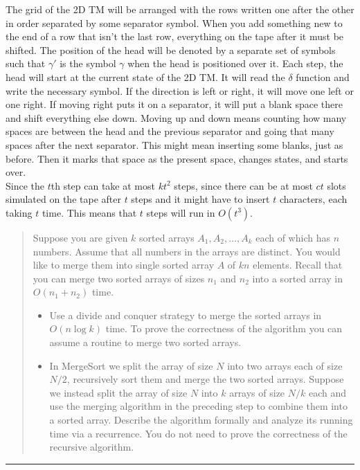 \documentclass[11pt]{article}
\begin{document}
\begin{solution}
    The grid of the 2D TM will be arranged with the rows written one after the other in order separated by some separator symbol. When you add something new to the end of a row that isn't the last row, everything on the tape after it must be shifted. The position of the head will be denoted by a separate set of symbols such that $\gamma'$ is the symbol $\gamma$ when the head is positioned over it. Each step, the head will start at the current state of the 2D TM. It will read the $\delta$ function and write the necessary symbol. If the direction is left or right, it will move one left or one right. If moving right puts it on a separator, it will put a blank space there and shift everything else down. Moving up and down means counting how many spaces are between the head and the previous separator and going that many spaces after the next separator. This might mean inserting some blanks, just as before. Then it marks that space as the present space, changes states, and starts over. \\

    Since the $t$th step can take at most $kt^2$ steps, since there can be at most $ct$ slots simulated on the tape after $t$ steps and it might have to insert $t$ characters, each taking $t$ time. This means that $t$ steps will run in $O(t^3)$.
\end{solution}


\begin{quote}
    Suppose you are given $k$ sorted arrays $A_1,A_2,\ldots,A_k$
  each of which has $n$ numbers. Assume that all numbers in the arrays
  are distinct. You would like to merge them into single sorted array
  $A$ of $kn$ elements. Recall that you can merge two sorted arrays of
  sizes $n_1$ and $n_2$ into a sorted array in $O(n_1+n_2)$ time.
  \begin{itemize}
  \item Use a divide and conquer strategy to merge the sorted arrays
    in $O(n \log k)$ time. To prove the correctness of the algorithm
    you can assume a routine to merge two sorted arrays.
  \item In MergeSort we split the array of size $N$ into two arrays
    each of size $N/2$, recursively sort them and merge the two sorted
    arrays. Suppose we instead split the array of size $N$ into $k$
    arrays of size $N/k$ each and use the merging algorithm in the
    preceding step to combine them into a sorted array.  Describe the
    algorithm formally and analyze its running time via a recurrence.
    You do not need to prove the correctness of the recursive algorithm.
  \end{itemize}
\end{quote}
\hrule
\end{document}
